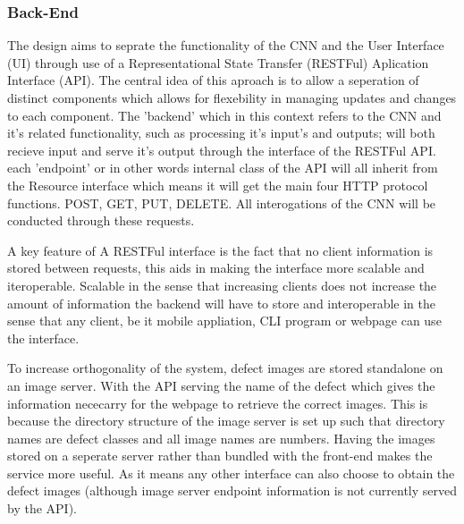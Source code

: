     \subsubsection{Back-End}
      The design aims to seprate the functionality of the CNN and the User Interface (UI) through use of a Representational State Transfer (RESTFul) Aplication Interface (API). The central idea of this aproach is to allow a seperation of distinct components which allows for flexebility in managing updates and changes to each component. The 'backend' which in this context refers to the CNN and it's related functionality, such as processing it's input's and outputs; will both recieve input and serve it's output through the interface of the RESTFul API. each 'endpoint' or in other words internal class of the API will all inherit from the Resource interface which means it will get the main four HTTP protocol functions. POST, GET, PUT, DELETE. All interogations of the CNN will be conducted through these requests.
      \par
      A key feature of A RESTFul interface is the fact that no client information is stored
      between requests, this aids in making the interface more scalable and iteroperable. Scalable in the sense that increasing clients does not increase the amount of information the backend will have to store and interoperable in the sense that any client, be it mobile appliation, CLI program or webpage can use the interface.
      \par
      To increase orthogonality of the system, defect images are stored standalone on an image server. With the API serving the name of the defect which gives the information nececarry for the webpage to retrieve the correct images. This is because the directory structure of the image server is set up such that directory names are defect classes and all image names are numbers. Having the images stored on a seperate server rather than bundled with the front-end makes the service more useful. As it means any other interface can also choose to obtain the defect images (although image server endpoint information is not currently served by the API).

